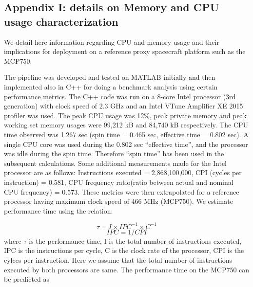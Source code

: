 \subsection{Appendix I: details on Memory and CPU usage characterization}
We detail here information regarding  CPU and memory usage and their implications for deployment on a reference proxy spacecraft platform such as the MCP750.

%
The pipeline was developed and tested on MATLAB initially and then implemented also in C++ for doing a benchmark analysis using certain performance metrics. The C++ code was run on a 8-core Intel processor (3rd generation) with clock speed of 2.3 GHz and an Intel VTune Amplifier XE 2015 profiler was used. The peak CPU usage was 12\%, peak private memory and peak working set memory usages were 99,212 kB and 84,740 kB respectively. The CPU time observed was 1.267 sec (spin time = 0.465 sec, effective time = 0.802 sec). A single CPU core was used during the 0.802 sec ``effective time'', and the processor was idle during the spin time. Therefore ``spin time'' has been used in the subsequent calculations. Some additional measurements made for the Intel processor are as follows:
        Instructions executed = 2,868,100,000, 
        CPI (cycles per instruction) = 0.581, 
        CPU frequency ratio(ratio between actual and nominal CPU frequency) = 0.573.
%        
These metrics were then extrapolated for a reference processor having maximum clock speed of 466 MHz (MCP750). We estimate performance time using the relation:
        
        \begin{equation}
        \tau = I\times IPC^{-1}\times C^{-1}
        \end{equation}
        \begin{equation}
        IPC = 1/CPI
        \end{equation}
        \noindent where $\tau$ is the performance time, I is the total number of instructions executed, IPC is the instructions per cycle, C is the clock rate of the processor, CPI is the cylces per instruction.
        Here we assume that the total number of instructions executed by both processors are same. The performance time on the MCP750 can be predicted as
        
